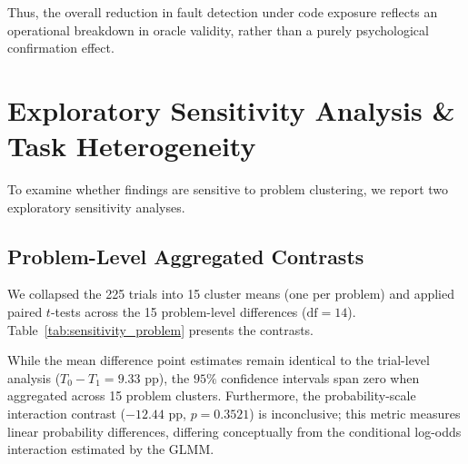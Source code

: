 \documentclass[11pt,a4paper]{article}
\begin{document}
Thus, the overall reduction in fault detection under code exposure reflects an operational breakdown in oracle validity, rather than a purely psychological confirmation effect.

\section{Exploratory Sensitivity Analysis \& Task Heterogeneity}
\label{sec:sensitivity}

To examine whether findings are sensitive to problem clustering, we report two exploratory sensitivity analyses.

\subsection{Problem-Level Aggregated Contrasts}
We collapsed the 225 trials into 15 cluster means (one per problem) and applied paired $t$-tests across the 15 problem-level differences ($\text{df}=14$). Table~\ref{tab:sensitivity_problem} presents the contrasts.

\begin{table}[h]
\centering
\caption{Exploratory Problem-Level Aggregated Contrasts ($N=15$ Problems, $\text{df}=14$).}
\label{tab:sensitivity_problem}
\small
\renewcommand{\arraystretch}{1.15}
\end{table}

While the mean difference point estimates remain identical to the trial-level analysis ($T_0 - T_1 = 9.33$ pp), the $95\%$ confidence intervals span zero when aggregated across 15 problem clusters. Furthermore, the probability-scale interaction contrast ($-12.44$ pp, $p = 0.3521$) is inconclusive; this metric measures linear probability differences, differing conceptually from the conditional log-odds interaction estimated by the GLMM.
\end{document}
